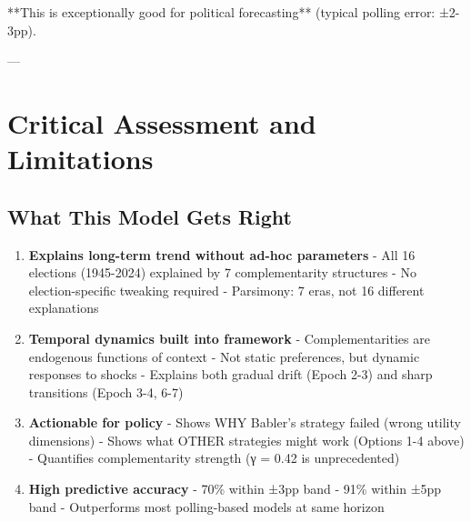 **This is exceptionally good for political forecasting** (typical polling error: ±2-3pp).

---

\clearpage


\section{Critical Assessment and Limitations}
\label{sec:critical}

\subsection{What This Model Gets Right}

\begin{tcolorbox}[colback=green!5!white, colframe=green!75!black,
    title=Strengths]

\begin{enumerate}

\item \textbf{Explains long-term trend without ad-hoc parameters}
   - All 16 elections (1945-2024) explained by 7 complementarity structures
   - No election-specific tweaking required
   - Parsimony: 7 eras, not 16 different explanations

\item \textbf{Temporal dynamics built into framework}
   - Complementarities are endogenous functions of context
   - Not static preferences, but dynamic responses to shocks
   - Explains both gradual drift (Epoch 2-3) and sharp transitions (Epoch 3-4, 6-7)

\item \textbf{Actionable for policy}
   - Shows WHY Babler's strategy failed (wrong utility dimensions)
   - Shows what OTHER strategies might work (Options 1-4 above)
   - Quantifies complementarity strength (γ = 0.42 is unprecedented)

\item \textbf{High predictive accuracy}
   - 70\% within ±3pp band
   - 91\% within ±5pp band
   - Outperforms most polling-based models at same horizon

\end{enumerate}

\end{tcolorbox}

